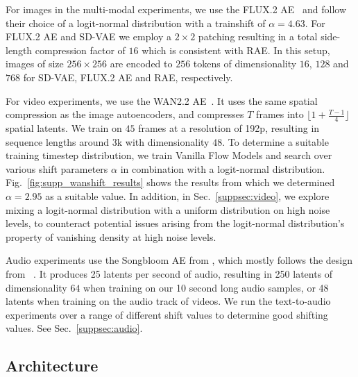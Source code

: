 \documentclass{article}
\theoremstyle{plain}
\theoremstyle{definition}
\theoremstyle{remark}
\begin{document}
For images in the multi-modal experiments, we use the FLUX.2 AE~\cite{bfl2025representation} and follow their choice of a logit-normal distribution with a trainshift of $\alpha=4.63$. For FLUX.2 AE and SD-VAE we employ a $2\times 2$ patching resulting in a total side-length compression factor of $16$ which is consistent with RAE. In this setup, images of size $256 \times 256$ are encoded to $256$ tokens of dimensionality $16$, $128$ and $768$ for SD-VAE, FLUX.2 AE and RAE, respectively.

For video experiments, we use the WAN2.2 AE~\cite{wan2025}. It uses the same spatial compression as the image autoencoders, and compresses $T$ frames into $\lfloor 1 + \frac{T - 1}{4} \rfloor$ spatial latents. We train on $45$ frames at a resolution of 192p, resulting in sequence lengths around 3k with dimensionality $48$. To determine a suitable training timestep distribution, we train Vanilla Flow Models and search over various shift parameters $\alpha$ in combination with a logit-normal distribution. Fig.~\ref{fig:supp_wanshift_results} shows the results from which we determined $\alpha=2.95$ as a suitable value. In addition, in Sec.~\ref{suppsec:video}, we explore mixing a logit-normal distribution with a uniform distribution on high noise levels, to counteract potential issues arising from the logit-normal distribution's property of vanishing density at high noise levels.

Audio experiments use the Songbloom AE from \citet{yang2025songbloom}, which mostly follows the design from ~\citet{evans2025stable}. It produces 25 latents per second of audio, resulting in 250 latents of dimensionality $64$ when training on our 10 second long audio samples, or 48 latents when training on the audio track of videos. We run the text-to-audio experiments over a range of different shift values to determine good shifting values. See Sec.~\ref{suppsec:audio}.

\subsection{Architecture}
\end{document}
